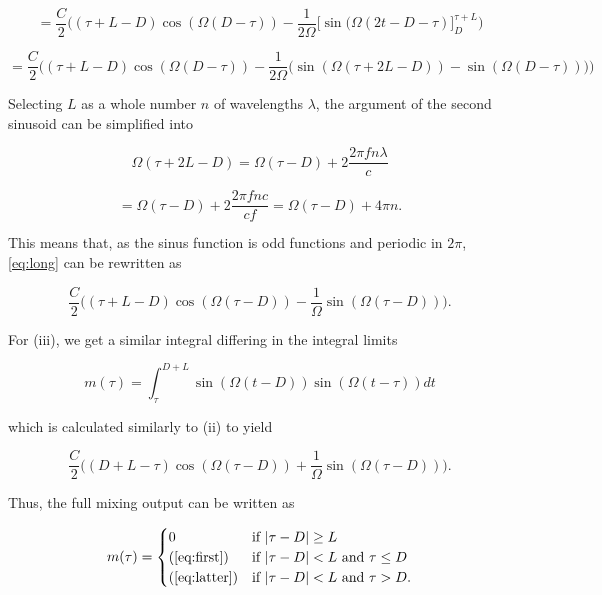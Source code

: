\begin{appendices}
\begin{equation}
	= \frac{C}{2}\Big( (\tau+L-D)\cos(\Omega(D-\tau)) 
	- \frac{1}{2\Omega}\Big[ \sin(\Omega(2t-D-\tau) \Big]_{D}^{\tau+L} \Big)
\end{equation}

\begin{equation}\label{eq:long}
	= \frac{C}{2}\Big((\tau + L - D)\cos(\Omega(D-\tau))
	- \frac{1}{2\Omega}\big(
	\sin(\Omega(\tau + 2L - D))
	- \sin(\Omega(D-\tau))
	\big)\Big)
\end{equation}

Selecting $L$ as a whole number $n$ of wavelengths $\lambda$, the argument of the second sinusoid can be simplified into

\begin{equation}
	\Omega(\tau + 2L - D) 
	= \Omega(\tau - D) + 2\frac{2\pi f n\lambda}{c} 
\end{equation}

\begin{equation}
	= \Omega(\tau - D) + 2\frac{2\pi f n c}{c f}
	= \Omega(\tau - D) + 4\pi n.
\end{equation}

This means that, as the sinus function is odd functions and periodic in $2\pi$, \ref{eq:long} can be rewritten as 

\begin{equation}\label{eq:first}
	 \frac{C}{2}\Big( (\tau+L-D)\cos(\Omega(\tau - D)) 
	- \frac{1}{\Omega}\sin(\Omega(\tau - D))\Big).
\end{equation}

For (iii), we get a similar integral differing in the integral limits

\begin{equation}
	m(\tau) 
	= \int_\tau^{D+L}\sin(\Omega(t-D))\sin(\Omega(t-\tau))dt
\end{equation}

which is calculated similarly to (ii) to yield

\begin{equation}\label{eq:latter}
	\frac{C}{2}\Big( (D + L - \tau)\cos(\Omega(\tau - D))
	+ \frac{1}{\Omega}\sin(\Omega(\tau - D))\Big).
\end{equation}

Thus, the full mixing output can be written as

\begin{equation}
	m(\tau) = \begin{cases}
		0 & \text{if $|\tau-D|\geq L$} \\
		\text{(\ref{eq:first})} & \text{if $|\tau-D| < L$ and $\tau \leq D$} \\
		\text{(\ref{eq:latter})} & \text{if $|\tau-D| < L$ and $\tau>D$}.
	\end{cases}
\end{equation}

\end{appendices}


